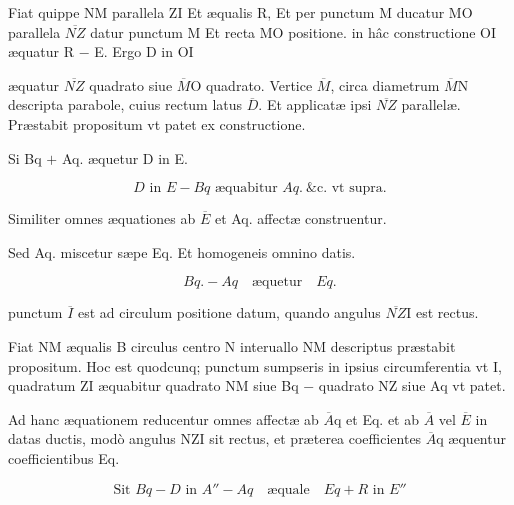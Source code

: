 \documentclass[11pt,a4paper]{article}
\begin{document}
Fiat quippe NM parallela ZI Et æqualis R, Et per punctum M ducatur MO parallela $\overline{NZ}$ datur punctum M Et recta MO positione. in hâc constructione OI æquatur R $-$ E. Ergo D in OI


æquatur $\overline{NZ}$ quadrato siue $\overline{M}$O quadrato. Vertice $\overline{M}$, circa diametrum $\overline{M}$N descripta parabole, cuius rectum latus $\overline{D}$. Et applicatæ ipsi $\overline{NZ}$ parallelæ. Præstabit propositum vt patet ex constructione.

Si Bq $+$ Aq. æquetur D in E.

\[ D \text{ in } E - Bq \text{ æquabitur } Aq. \ \text{\&c. vt supra.} \]

Similiter omnes æquationes ab $\overline{E}$ et Aq. affectæ construentur.

Sed Aq. miscetur sæpe Eq. Et homogeneis omnino datis.

\[ Bq. - Aq \quad \text{æquetur} \quad Eq. \]

punctum $\overline{I}$ est ad circulum positione datum, quando angulus $\overline{NZ}$I est rectus.

Fiat NM æqualis B circulus centro N interuallo NM descriptus præstabit propositum. Hoc est quodcunq; punctum sumpseris in ipsius circumferentia vt I, quadratum ZI æquabitur quadrato NM siue Bq $-$ quadrato NZ siue Aq vt patet. 


Ad hanc æquationem reducentur omnes affectæ ab $\overline{A}$q et Eq. et ab $\overline{A}$ vel $\overline{E}$ in datas ductis, modò angulus NZI sit rectus, et præterea coefficientes $\overline{A}$q æquentur coefficientibus Eq.

\[ \text{Sit } Bq - D \text{ in } A'' - Aq \quad \text{æquale} \quad Eq + R \text{ in } E'' \]
\end{document}
